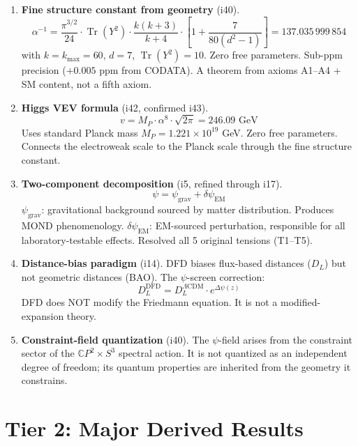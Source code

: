 \documentclass[11pt,a4paper]{article}
\newcommand{\Tr}{\operatorname{Tr}}
\newcommand{\CP}{\mathbb{C}P}
\begin{document}
\begin{enumerate}[label=\textbf{B\arabic*.}, leftmargin=2cm]

\item \textbf{Fine structure constant from geometry} (i40).
\[
\alpha^{-1} = \frac{\pi^{3/2}}{24} \cdot \Tr(Y^2) \cdot \frac{k(k+3)}{k+4} \cdot \left[1 + \frac{7}{80(d^2-1)}\right] = 137.035\,999\,854
\]
with $k = k_{\max} = 60$, $d = 7$, $\Tr(Y^2) = 10$. Zero free parameters. Sub-ppm precision ($+0.005$ ppm from CODATA). A theorem from axioms A1--A4 + SM content, not a fifth axiom.

\item \textbf{Higgs VEV formula} (i42, confirmed i43).
\[
v = M_P \cdot \alpha^8 \cdot \sqrt{2\pi} = 246.09 \text{ GeV}
\]
Uses standard Planck mass $M_P = 1.221 \times 10^{19}$ GeV. Zero free parameters. Connects the electroweak scale to the Planck scale through the fine structure constant.

\item \textbf{Two-component decomposition} (i5, refined through i17).
\[
\psi = \psi_\text{grav} + \delta\psi_\text{EM}
\]
$\psi_\text{grav}$: gravitational background sourced by matter distribution. Produces MOND phenomenology. $\delta\psi_\text{EM}$: EM-sourced perturbation, responsible for all laboratory-testable effects. Resolved all 5 original tensions (T1--T5).

\item \textbf{Distance-bias paradigm} (i14). DFD biases flux-based distances ($D_L$) but not geometric distances (BAO). The $\psi$-screen correction:
\[
D_L^\text{DFD} = D_L^{\Lambda\text{CDM}} \cdot e^{\Delta\psi(z)}
\]
DFD does NOT modify the Friedmann equation. It is not a modified-expansion theory.

\item \textbf{Constraint-field quantization} (i40). The $\psi$-field arises from the constraint sector of the $\CP^2 \times S^3$ spectral action. It is not quantized as an independent degree of freedom; its quantum properties are inherited from the geometry it constrains.

\end{enumerate}

\section{Tier 2: Major Derived Results}
\end{document}
